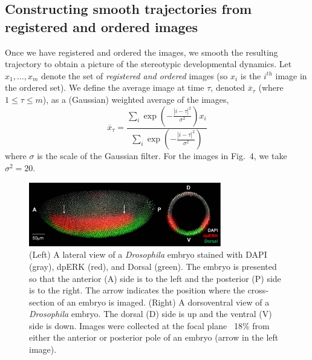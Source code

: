 \documentclass{pnastwo}
\newcommand{\fig}[0]{Fig.}
\begin{document}
\begin{article}
\subsection{Constructing smooth trajectories from registered and ordered images}

Once we have registered and ordered the images, we smooth the resulting trajectory to obtain a picture of the stereotypic developmental dynamics. 
%
Let $x_1, \dots, x_m$ denote the set of {\em registered and ordered} images (so $x_i$ is the $i^{th}$ image in the ordered set).
%
We define the average image at time $\tau$, denoted $\overline{x}_{\tau}$ (where $1 \le \tau \le m$), as a (Gaussian) weighted average of the images,
\begin{equation}
\overline{x}_{\tau} =  \frac{\sum_i \exp \left( - \frac{|i - \tau|^2}{\sigma^2} \right) x_i}{\sum_i \exp \left( - \frac{|i - \tau|^2}{\sigma^2} \right) }
\end{equation}
where $\sigma$ is the scale of the Gaussian filter. 
%
For the images in \fig~4, we take $\sigma^2 = 20$.






\end{article}

\begin{figure}
\includegraphics[width=8.4cm]{ap_dv}
\caption{(Left) A lateral view of a {\it Drosophila} embryo stained with DAPI (gray), dpERK (red), and Dorsal (green). The embryo is presented so that the anterior (A) side is to the left and the posterior (P) side is to the right. The arrow indicates the position where the cross-section of an embryo is imaged. (Right) A dorsoventral view of a {\it Drosophila} embryo. The dorsal (D) side is up and the ventral (V) side is down. Images were collected at the focal plane ~18\% from either the anterior or posterior pole of an embryo (arrow in the left image). }
\end{figure}
\end{document}
